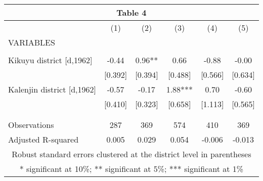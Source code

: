 \begin{tabular}{lccccc}
\multicolumn{6}{c}{Table 4} \\ \hline
 & (1) & (2) & (3) & (4) & (5) \\
VARIABLES &  &  &  &  &  \\ \hline
 &  &  &  &  &  \\
Kikuyu district [d,1962] & -0.44 & 0.96** & 0.66 & -0.88 & -0.00 \\
 & [0.392] & [0.394] & [0.488] & [0.566] & [0.634] \\
Kalenjin district [d,1962] & -0.57 & -0.17 & 1.88*** & 0.70 & -0.60 \\
 & [0.410] & [0.323] & [0.658] & [1.113] & [0.565] \\
 &  &  &  &  &  \\
 &  &  &  &  &  \\
Observations & 287 & 369 & 574 & 410 & 369 \\
 Adjusted R-squared & 0.005 & 0.029 & 0.054 & -0.006 & -0.013 \\ \hline
\multicolumn{6}{c}{ Robust standard errors clustered at the district level in parentheses} \\
\multicolumn{6}{c}{ * significant at 10\%; ** significant at 5\%; *** significant at 1\%} \\
\end{tabular}
